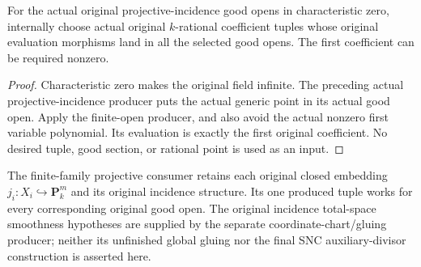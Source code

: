 \begin{lemma}
\label{lem:kn-nadel-bertini-rational-projective-good}
\leanok
For the actual original projective-incidence good opens in characteristic
zero, internally choose actual original $k$-rational coefficient tuples
whose original evaluation morphisms land in all the selected good opens.
The first coefficient can be required nonzero.
\end{lemma}
\begin{proof}
Characteristic zero makes the original field infinite.  The preceding
actual projective-incidence producer puts the actual generic point in
its actual good open.  Apply the finite-open producer, and also avoid the
actual nonzero first variable polynomial.  Its evaluation is exactly the
first original coefficient.  No desired tuple, good section, or rational
point is used as an input.
\end{proof}


The finite-family projective consumer retains each original closed embedding
$j_i:X_i\hookrightarrow\mathbf P^m_k$ and its original incidence structure.
Its one produced tuple works for every corresponding original good open.
The original incidence total-space smoothness hypotheses are supplied by the
separate coordinate-chart/gluing producer; neither its unfinished global
gluing nor the final SNC auxiliary-divisor construction is asserted here.
